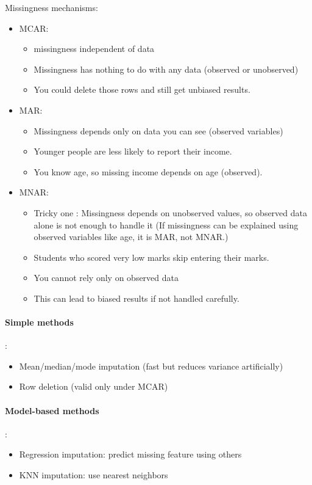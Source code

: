 \documentclass[10pt,a4paper]{article}
\begin{document}
	Missingness mechanisms:
	\begin{itemize}
		\item MCAR:
		\begin{itemize}
			\item missingness independent of data
			\item Missingness has nothing to do with any data (observed or unobserved)
			\item You could delete those rows and still get unbiased results.
		\end{itemize}
		\item MAR:
		\begin{itemize}
			\item Missingness depends only on data you can see (observed variables)
			\item Younger people are less likely to report their income.
			\item You know age, so missing income depends on age (observed).
		\end{itemize}
		\item MNAR:
		\begin{itemize}
			\item Tricky one : Missingness depends on unobserved values, so observed data alone is not enough to handle it (If missingness can be explained using observed variables like age, it is MAR, not MNAR.)
			\item Students who scored very low marks skip entering their marks.
			\item You cannot rely only on observed data
			\item This can lead to biased results if not handled carefully.
		\end{itemize}
	\end{itemize}

	\paragraph{Simple methods}:
	\begin{itemize}
		\item Mean/median/mode imputation (fast but reduces variance artificially)
		\item Row deletion (valid only under MCAR)
	\end{itemize}

	\paragraph{Model-based methods}:
	\begin{itemize}
		\item Regression imputation: predict missing feature using others
		\item KNN imputation: use nearest neighbors
	\end{itemize}
\end{document}
